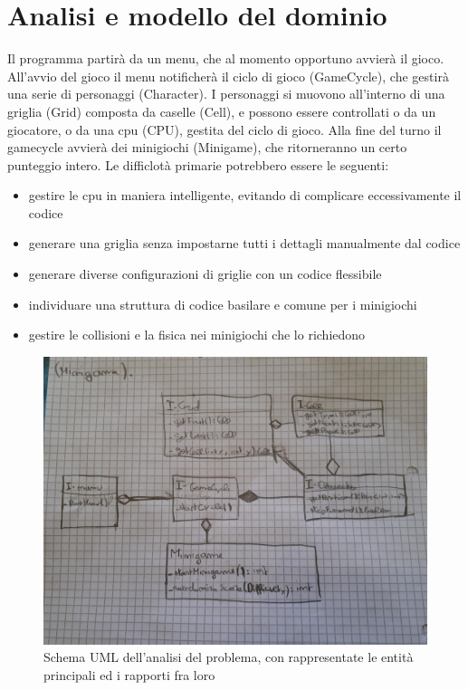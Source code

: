 \documentclass[a4paper,12pt]{report}
\begin{document}
	\section{Analisi e modello del dominio}

	Il programma partirà da un menu, che al momento opportuno avvierà il gioco.
	All'avvio del gioco il menu notificherà il ciclo di gioco (GameCycle), che gestirà una serie di personaggi (Character).
	I personaggi si muovono all'interno di una griglia (Grid) composta da caselle (Cell), e possono essere controllati o da un giocatore, o da una cpu (CPU), gestita del ciclo di gioco.
	Alla fine del turno il gamecycle avvierà dei minigiochi (Minigame), che ritorneranno un certo punteggio intero.
	Le difficlotà primarie potrebbero essere le seguenti:
	\begin{itemize}
		\item gestire le cpu in maniera intelligente, evitando di complicare eccessivamente il codice
		\item generare una griglia senza impostarne tutti i dettagli manualmente dal codice
		\item generare diverse configurazioni di griglie con un codice flessibile
		\item individuare una struttura di codice basilare e comune per i minigiochi
		\item gestire le collisioni e la fisica nei minigiochi che lo richiedono
	\end{itemize}

	\begin{figure}[!t]
		\centering{}
		\includegraphics[width=150mm]{images/domain.jpeg}
		\caption{Schema UML dell'analisi del problema, con rappresentate le entità principali ed i rapporti fra loro}
		\label{img:analysis}
	\end{figure}
\end{document}
